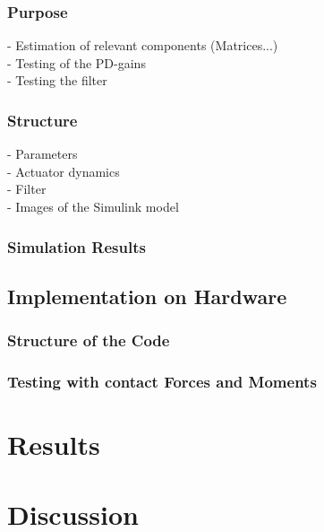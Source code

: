 \documentclass[11pt, a4paper, twoside]{report}
\begin{document}
\subsection{Purpose} \label{subsec:purpose}

- Estimation of relevant components (Matrices...)\\
- Testing of the PD-gains\\
- Testing the filter

\subsection{Structure} \label{subsec:Structure}
- Parameters\\
- Actuator dynamics\\
- Filter\\
- Images of the Simulink model

\subsection{Simulation Results} \label{subsec:simulation_results}

\section{Implementation on Hardware} \label{sec:implementation_on_hardware}

\subsection{Structure of the Code} \label{subsec:structure_ofthe_code}

\subsection{Testing with contact Forces and Moments} \label{subsec:testing_with_fandm}

\chapter{Results} \label{cha:results}

\thispagestyle{fancy}



\chapter{Discussion} \label{cha:discussion}
\end{document}
